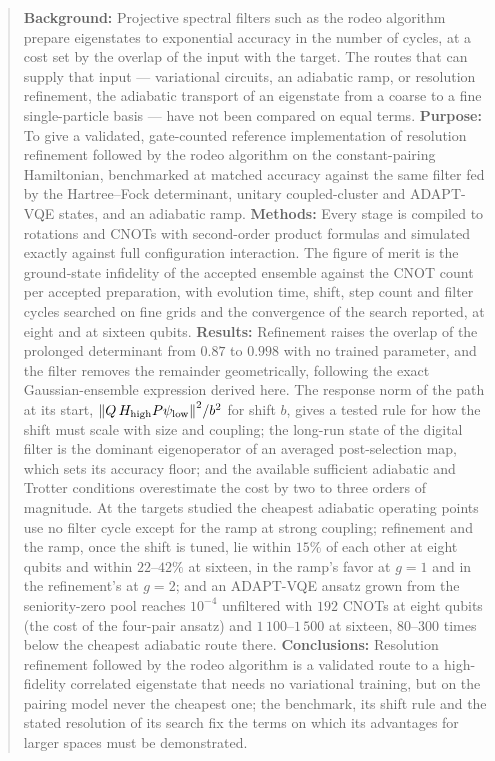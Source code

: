 \documentclass[
  aps,            %
  prc,            %
  reprint,        %
  superscriptaddress,
  floatfix,
  nofootinbib
]{revtex4-2}
\newcommand{\Hhigh}{H_{\mathrm{high}}}
\begin{document}
\begin{abstract}
\textbf{Background:} Projective spectral filters such as the rodeo
algorithm prepare eigenstates to exponential accuracy in the number of
cycles, at a cost set by the overlap of the input with the target.  The
routes that can supply that input --- variational circuits, an adiabatic
ramp, or resolution refinement, the adiabatic transport of an eigenstate
from a coarse to a fine single-particle basis --- have not been compared on
equal terms.
\textbf{Purpose:} To give a validated, gate-counted reference
implementation of resolution refinement followed by the rodeo algorithm on
the constant-pairing Hamiltonian, benchmarked at matched accuracy against
the same filter fed by the Hartree--Fock determinant, unitary
coupled-cluster and ADAPT-VQE states, and an adiabatic ramp.
\textbf{Methods:} Every stage is compiled to rotations and CNOTs with
second-order product formulas and simulated exactly against full
configuration interaction.  The figure of merit is the ground-state
infidelity of the accepted ensemble against the CNOT count per accepted
preparation, with evolution time, shift, step count and filter cycles
searched on fine grids and the convergence of the search reported, at
eight and at sixteen qubits.
\textbf{Results:} Refinement raises the overlap of the prolonged
determinant from $0.87$ to $0.998$ with no trained parameter, and the
filter removes the remainder geometrically, following the exact
Gaussian-ensemble expression derived here.  The response norm of the path
at its start, $\norm{Q\,\Hhigh P\psi_{\rm low}}^2/b^2$ for shift $b$, gives
a tested rule for how the shift must scale with size and coupling; the
long-run state of the digital filter is the dominant eigenoperator of an
averaged post-selection map, which sets its accuracy floor; and the
available sufficient adiabatic and Trotter conditions overestimate the
cost by two to three orders of magnitude.  At the targets studied the
cheapest adiabatic operating points use no filter cycle except for the
ramp at strong coupling; refinement and the ramp, once the shift is tuned,
lie within $15\%$ of each other at eight qubits and within $22$--$42\%$ at
sixteen, in the ramp's favor at $g=1$ and in the refinement's at $g=2$; and
an ADAPT-VQE ansatz grown from the seniority-zero pool reaches $10^{-4}$
unfiltered with $192$ CNOTs at eight qubits (the cost of the four-pair
ansatz) and $1\,100$--$1\,500$ at sixteen, $80$--$300$ times below the
cheapest adiabatic route there.
\textbf{Conclusions:} Resolution refinement followed by the rodeo algorithm
is a validated route to a high-fidelity correlated eigenstate that needs no
variational training, but on the pairing model never the cheapest one; the
benchmark, its shift rule and the stated resolution of its search fix the
terms on which its advantages for larger spaces must be demonstrated.
\end{abstract}
\end{document}
